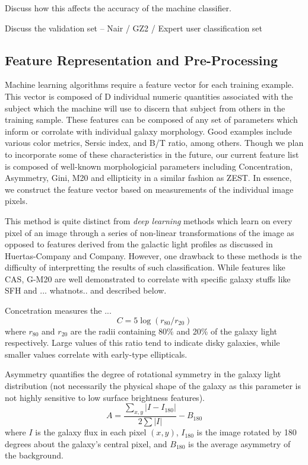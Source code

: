 \documentclass[twocolumn]{aastex6}
\newcommand{\rr}[1]{$r_{#1}$}
\begin{document}
Discuss how this affects the accuracy of the machine classifier. 

Discuss the validation set -- Nair / GZ2 / Expert user classification set


 
\subsection{Feature Representation and Pre-Processing}
Machine learning algorithms require a feature vector for each training example. This vector is composed of D individual numeric quantities associated with the subject which the machine will use to discern that subject from others in the training sample. These features can be composed of any set of parameters which inform or corrolate with individual galaxy morphology. Good examples include various color metrics, Sersic index, and B/T ratio, among others. Though we plan to incorporate some of these characteristics in the future, our current feature list is composed of well-known morphologicial parameters including Concentration, Asymmetry, Gini, M20 and ellipticity in a similar fashion as ZEST. In essence, we construct the feature vector based on measurements of the individual image pixels. 

This method is quite distinct from \textit{deep learning} methods which learn on every pixel of an image through a series of non-linear transformations of the image as opposed to features derived from the galactic light profiles as discussed in Huertas-Company and Company. However, one drawback to these methods is the difficulty of interpretting the results of such classification. While features like CAS, G-M20 are well demonstrated to correlate with specific galaxy stuffs like SFH and ... whatnots.. and described below. 

Concetration measures the ... 
\begin{equation}
C = 5\log(r_{80}/ r_{20})
\end{equation}
where \rr{80} and \rr{20} are the radii containing 80\% and 20\% of the galaxy light respectively.  Large values of this ratio tend to indicate disky galaxies, while smaller values correlate with early-type ellipticals. 

Asymmetry quantifies the degree of rotational symmetry in the galaxy light distribution (not necessarily the physical shape of the galaxy as this parameter is not highly sensitive to low surface brightness features).  
\begin{equation}
A = \frac{\sum_{x,y} |I - I_{180}|}{ 2\sum|I|} - B_{180}
\end{equation}
where $I$ is the galaxy flux in each pixel $(x, y)$, $I_{180}$ is the image rotated by 180 degrees about the galaxy's central pixel, and $B_{180}$ is the average asymmetry of the background. 
\end{document}
